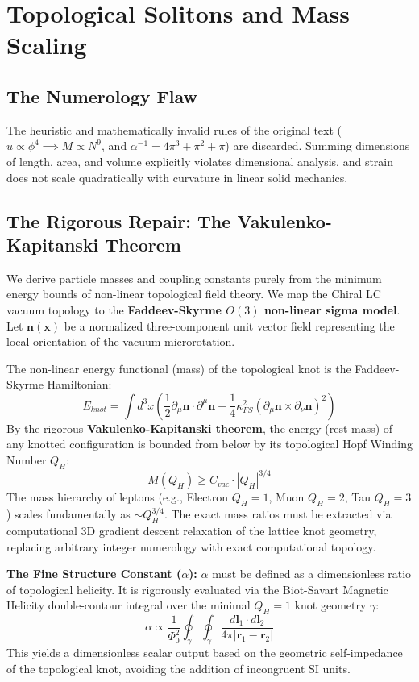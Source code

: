 \documentclass[11pt,a4paper]{article}
\begin{document}
\section{Topological Solitons and Mass Scaling}

\subsection{The Numerology Flaw}
The heuristic and mathematically invalid rules of the original text ($u \propto \phi^4 \implies M \propto N^9$, and $\alpha^{-1} = 4\pi^3 + \pi^2 + \pi$) are discarded. Summing dimensions of length, area, and volume explicitly violates dimensional analysis, and strain does not scale quadratically with curvature in linear solid mechanics.

\subsection{The Rigorous Repair: The Vakulenko-Kapitanski Theorem}
We derive particle masses and coupling constants purely from the minimum energy bounds of non-linear topological field theory. We map the Chiral LC vacuum topology to the \textbf{Faddeev-Skyrme $O(3)$ non-linear sigma model}. Let $\mathbf{n}(\mathbf{x})$ be a normalized three-component unit vector field representing the local orientation of the vacuum microrotation.

The non-linear energy functional (mass) of the topological knot is the Faddeev-Skyrme Hamiltonian:
\begin{equation}
    E_{knot} = \int d^3x \left( \frac{1}{2} \partial_\mu \mathbf{n} \cdot \partial^\mu \mathbf{n} + \frac{1}{4} \kappa_{FS}^2 (\partial_\mu \mathbf{n} \times \partial_\nu \mathbf{n})^2 \right)
\end{equation}
By the rigorous \textbf{Vakulenko-Kapitanski theorem}, the energy (rest mass) of any knotted configuration is bounded from below by its topological Hopf Winding Number $Q_H$:
\begin{equation}
    M(Q_H) \ge C_{vac} \cdot |Q_H|^{3/4}
\end{equation}
The mass hierarchy of leptons (e.g., Electron $Q_H=1$, Muon $Q_H=2$, Tau $Q_H=3$) scales fundamentally as $\sim Q_H^{3/4}$. The exact mass ratios must be extracted via computational 3D gradient descent relaxation of the lattice knot geometry, replacing arbitrary integer numerology with exact computational topology.

\textbf{The Fine Structure Constant ($\alpha$):} $\alpha$ must be defined as a dimensionless ratio of topological helicity. It is rigorously evaluated via the Biot-Savart Magnetic Helicity double-contour integral over the minimal $Q_H=1$ knot geometry $\gamma$:
\begin{equation}
    \alpha \propto \frac{1}{\Phi_0^2} \oint_{\gamma} \oint_{\gamma} \frac{d\mathbf{l}_1 \cdot d\mathbf{l}_2}{4\pi |\mathbf{r}_1 - \mathbf{r}_2|}
\end{equation}
This yields a dimensionless scalar output based on the geometric self-impedance of the topological knot, avoiding the addition of incongruent SI units.
\end{document}
